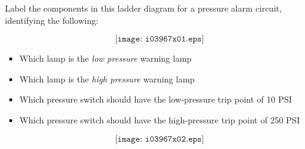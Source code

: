 

Label the components in this ladder diagram for a pressure alarm circuit, identifying the following:

$$\texttt{[image: i03967x01.eps]}$$

\begin{itemize}
\item{} Which lamp is the {\it low pressure} warning lamp
\vskip 10pt 
\item{} Which lamp is the {\it high pressure} warning lamp
\vskip 10pt 
\item{} Which pressure switch should have the low-pressure trip point of 10 PSI
\vskip 10pt 
\item{} Which pressure switch should have the high-pressure trip point of 250 PSI
\end{itemize}







$$\texttt{[image: i03967x02.eps]}$$











